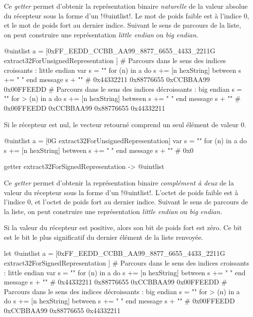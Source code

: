 Ce \emph{getter} permet d'obtenir la représentation binaire \emph{naturelle} de la valeur absolue du récepteur sous la forme d'un \ggs!@uintlist!. Le mot de poids faible est à l'indice $0$, et le mot de poids fort au dernier indice. Suivant le sens de parcours de la liste, on peut construire une représentation \emph{little endian} ou \emph{big endian}.

\begin{galgas}
@uintlist a = [0xFF_EEDD_CCBB_AA99_8877_6655_4433_2211G
  extract32ForUnsignedRepresentation
]
# Parcours dans le sens des indices croissants : little endian
var s = ""
for (n) in a
  do s += [n hexString]
  between s += " "
end
message s + "\n" # 0x44332211 0x88776655 0xCCBBAA99 0x00FFEEDD 
# Parcours dans le sens des indices décroissants : big endian
s = ""
for > (n) in a
  do s += [n hexString]
  between s += " "
end
message s + "\n" # 0x00FFEEDD 0xCCBBAA99 0x88776655 0x44332211
\end{galgas}

Si le récepteur est nul, le vecteur retourné comprend un seul élément de valeur $0$.

\begin{galgas}
@uintlist a = [0G extract32ForUnsignedRepresentation]
var s = ""
for (n) in a
  do s += [n hexString]
  between s += " "
end
message s + "\n" # 0x0
\end{galgas}





\begin{galgasbox}
getter extract32ForSignedRepresentation -> @uintlist
\end{galgasbox}

Ce \emph{getter} permet d'obtenir la représentation binaire \emph{complément à deux} de la valeur du récepteur sous la forme d'un \ggs!@uintlist!. L'octet de poids faible est à l'indice $0$, et l'octet de poids fort au dernier indice. Suivant le sens de parcours de la liste, on peut construire une représentation \emph{little endian} ou \emph{big endian}.

Si la valeur du récepteur est positive, alors son bit de poids fort est zéro. Ce bit est le bit le plus significatif du dernier élément de la liste renvoyée.

\begin{galgas}
let @uintlist a = [0xFF_EEDD_CCBB_AA99_8877_6655_4433_2211G
  extract32ForSignedRepresentation
]
# Parcours dans le sens des indices croissants : little endian
var s = ""
for (n) in a
  do s += [n hexString]
  between s += " "
end
message s + "\n" # 0x44332211 0x88776655 0xCCBBAA99 0x00FFEEDD
# Parcours dans le sens des indices décroissants : big endian
s = ""
for > (n) in a
  do s += [n hexString]
  between s += " "
end
message s + "\n" # 0x00FFEEDD 0xCCBBAA99 0x88776655 0x44332211
\end{galgas}

